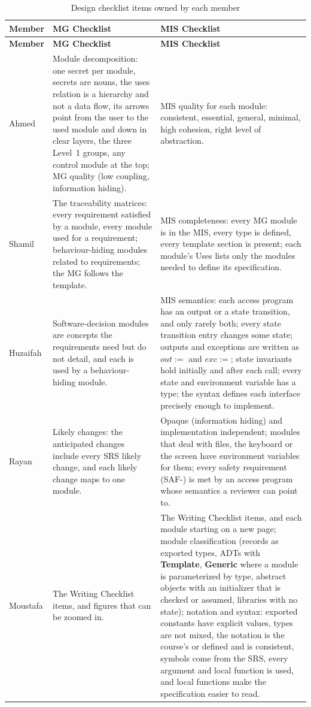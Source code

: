 \documentclass[12pt, titlepage]{article}
\begin{document}
{\small
\begin{longtable}{@{}>{\raggedright\arraybackslash}p{}
  >{\raggedright\arraybackslash}p{}
  >{\raggedright\arraybackslash}p{}@{}}
\caption{Design checklist items owned by each member}
\label{tab:designChecklist}\\
\toprule
\textbf{Member} & \textbf{MG Checklist} & \textbf{MIS Checklist} \\
\midrule
\endfirsthead
\toprule
\textbf{Member} & \textbf{MG Checklist} & \textbf{MIS Checklist} \\
\midrule
\endhead
\bottomrule
\endlastfoot
Ahmed & Module decomposition: one secret per module, secrets are nouns, the
uses relation is a hierarchy and not a data flow, its arrows point from the
user to the used module and down in clear layers, the three Level~1 groups,
any control module at the top; MG quality (low coupling, information
hiding). & MIS quality for each module: consistent, essential, general,
minimal, high cohesion, right level of abstraction. \\
\addlinespace
Shamil & The traceability matrices: every requirement satisfied by a module,
every module used for a requirement; behaviour-hiding modules related to
requirements; the MG follows the template. & MIS completeness: every MG
module is in the MIS, every type is defined, every template section is
present; each module's Uses lists only the modules needed to define its
specification. \\
\addlinespace
Huzaifah & Software-decision modules are concepts the requirements need but
do not detail, and each is used by a behaviour-hiding module. & MIS
semantics: each access program has an output or a state transition, and
only rarely both; every state transition entry changes some state; outputs
and exceptions are written as $out :=$ and $exc :=$; state invariants hold
initially and after each call; every state and environment variable has a
type; the syntax defines each interface precisely enough to implement. \\
\addlinespace
Rayan & Likely changes: the anticipated changes include every SRS likely
change, and each likely change maps to one module. & Opaque (information
hiding) and implementation independent; modules that deal with files, the
keyboard or the screen have environment variables for them; every safety
requirement (SAF-) is met by an access program whose semantics a reviewer
can point to. \\
\addlinespace
Moustafa & The Writing Checklist items, and figures that can be zoomed in. &
The Writing Checklist items, and each module starting on a new page; module
classification (records as exported types, ADTs with \textbf{Template},
\textbf{Generic} where a module is parameterized by type, abstract objects
with an initializer that is checked or assumed, libraries with no state);
notation and syntax: exported constants have explicit values, types are not
mixed, the notation is the course's or defined and is consistent, symbols
come from the SRS, every argument and local function is used, and local
functions make the specification easier to read. \\
\end{longtable}
}
\end{document}

